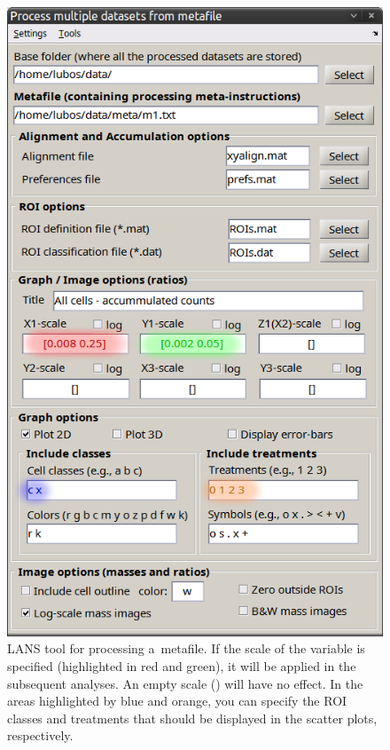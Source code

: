 \begin{figure}[!ht]
\centering
\includegraphics[scale=0.4]{figs3/LANS-process-metafile}
\caption{\label{fig:process-metafile}%
LANS tool for processing a~metafile. If the scale of the variable is specified (highlighted in red and green), it will be applied in the subsequent analyses. An empty scale (\ttt{[]}) will have no effect. In the areas highlighted by blue and orange, you can specify the ROI classes and treatments that should be displayed in the scatter plots, respectively.}
\end{figure}


